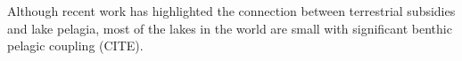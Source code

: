 
Although recent work has highlighted the connection between terrestrial subsidies and lake pelagia, most of the lakes in the world are small \cite{Downing_2007} with significant benthic pelagic coupling (CITE). \cite{MCCONNELL_1968}







